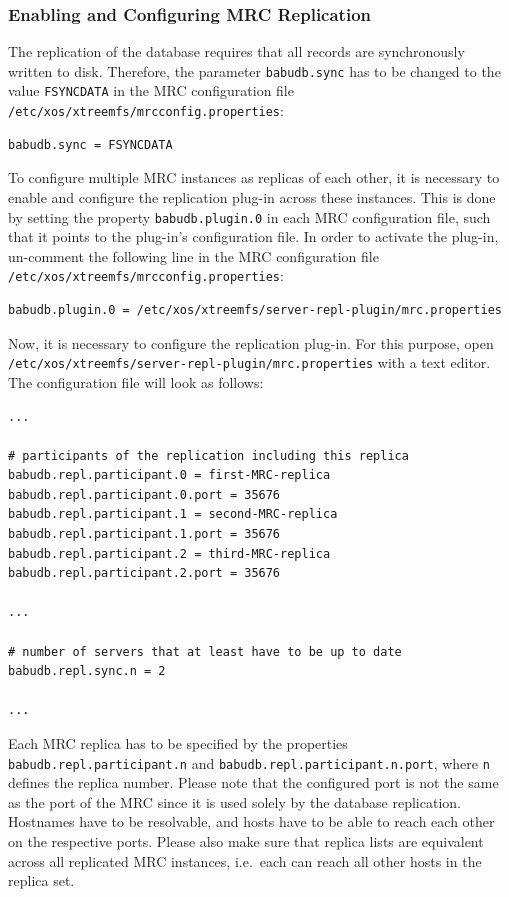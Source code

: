 \documentclass[a4paper,10pt]{book}
\begin{document}
\subsubsection{Enabling and Configuring MRC Replication}
The replication of the database requires that all records are synchronously written to disk. Therefore, the parameter \texttt{babudb.sync} has to be changed to the value \texttt{FSYNCDATA} in the MRC configuration file \texttt{/etc/xos/xtreemfs/mrcconfig.properties}:
\begin{verbatim}
babudb.sync = FSYNCDATA
\end{verbatim}

To configure multiple MRC instances as replicas of each other, it is necessary to enable and configure the replication plug-in across these instances. This is done by setting the property \texttt{babudb.plugin.0} in each MRC configuration file, such that it points to the plug-in's configuration file. In order to activate the plug-in, un-comment the following line in the MRC configuration file \texttt{/etc/xos/xtreemfs/mrcconfig.properties}:

\begin{verbatim}
babudb.plugin.0 = /etc/xos/xtreemfs/server-repl-plugin/mrc.properties
\end{verbatim}

Now, it is necessary to configure the replication plug-in. For this purpose, open \texttt{/etc/xos/xtreemfs/server-repl-plugin/mrc.properties} with a text editor. The configuration file will look as follows:

\begin{verbatim}
...

# participants of the replication including this replica
babudb.repl.participant.0 = first-MRC-replica
babudb.repl.participant.0.port = 35676
babudb.repl.participant.1 = second-MRC-replica
babudb.repl.participant.1.port = 35676
babudb.repl.participant.2 = third-MRC-replica
babudb.repl.participant.2.port = 35676

...

# number of servers that at least have to be up to date
babudb.repl.sync.n = 2

...
\end{verbatim}


Each MRC replica has to be specified by the properties \texttt{babudb.repl.participant.n} and \texttt{babudb.repl.participant.n.port}, where \texttt{n} defines the replica number. Please note that the configured port is not the same as the port of the MRC since it is used solely by the database replication. Hostnames have to be resolvable, and hosts have to be able to reach each other on the respective ports. Please also make sure that replica lists are equivalent across all replicated MRC instances, i.e.\ each can reach all other hosts in the replica set.
\end{document}

